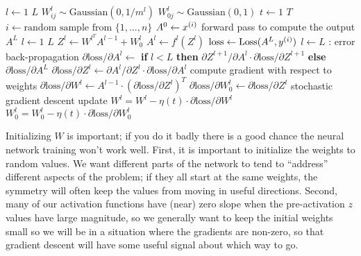 \begin{codebox}
    \li     \For $l \gets 1$ \To $L$
    \Do
    \li        $W_{ij}^l \sim \text{Gaussian}(0, 1/m^l)$
    \li        $W_{0j}^l \sim \text{Gaussian}(0, 1)$
    \End
    \li \For $t \gets 1$ \To $T$
    \li   \Do
  $i \gets \text{random sample from } \{1,\ldots,n\}$
    \li     $A^0 \gets x^{(i)}$
    \li     \Comment forward pass to compute the output $A^L$
    \li     \For $l \gets 1$ \To $L$
    \li       \Do
  $Z^l \gets W^{l^T}A^{l-1} + W_0^l$
    \li         $A^l \gets f^l(Z^l)$
    \End
    \li     $\text{loss} \gets \text{Loss}(A^L, y^{(i)})$
    \li     \For $l \gets L$ :
    \Do
    \li       \Comment error back-propagation
    \li       $\partial \text{loss}/\partial A^l \gets$ 	%
    {\bf if} $l < L$
    {\bf then}
  $\partial Z^{l+1}/\partial A^l \cdot \partial \text{loss}/\partial Z^{l+1} $
    {\bf else}
  $ \partial \text{loss}/\partial A^L$
    \li       $\partial \text{loss}/\partial Z^l \gets \partial
  A^l/\partial Z^l  \cdot \partial
  \text{loss}/\partial A^l$
    \li       \Comment compute gradient with respect to weights
    \li       $\partial \text{loss}/\partial W^l  \gets        A^{l-1}      \cdot    \left( \partial \text{loss}/\partial Z^l  \right)^T $
    \li       $\partial \text{loss}/\partial W_0^l \gets       \partial \text{loss}/\partial Z^l $
    \li       \Comment stochastic gradient descent update
    \li       $W^l = W^l - \eta(t)\cdot \partial \text{loss}/\partial W^l$
    \li       $W^l_0 = W_0^l - \eta(t)\cdot \partial \text{loss}/\partial W_0^l$
  \End
\end{codebox}

Initializing $W$ is important;  if you do it badly there is a good
chance the neural network training won't work well.  First, it is
important to initialize the weights to random values.  We want
different parts of the network to tend to ``address'' different
aspects of the problem; if they all start at the same weights, the
symmetry will often keep the values from moving in useful directions.
Second, many of our activation functions have (near) zero slope when
the pre-activation $z$ values have large magnitude, so we generally
want to keep the initial weights small so we will be in a situation
where the gradients are non-zero, so that gradient descent will have
some useful signal about which way to go.

